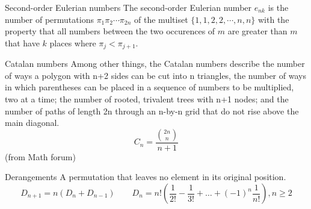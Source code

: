 \begin{algorithm}{Second-order Eulerian numbers}
\desc
The second-order Eulerian number $e_{nk}$ is the number of
permutations $\pi_1 \pi_2 \cdots \pi_{2n}$ of the multiset
$\{1,1,2,2,\cdots,n,n\}$ with the property that all numbers between
the two occurences of $m$ are greater than $m$ that have $k$ places
where $\pi_j < \pi_{j+1}$.
\end{algorithm}

\begin{algorithm}{Catalan numbers}
\keyword{}
Among other things, the Catalan numbers describe the number of ways a polygon
with n+2 sides can be cut into n triangles, the number of ways in which
parentheses can be placed in a sequence of numbers to be multiplied, two at
a time; the number of rooted, trivalent trees with n+1 nodes; and the number
of paths of length 2n through an n-by-n grid that do not rise above the
main diagonal.
$$ C_n = \frac{\binom{2n}{n}}{\scriptstyle n+1} $$
(from Math forum)
\end{algorithm}

\begin{algorithm}{Derangements}
\keyword{}
A permutation that leaves no element in its original position.
$$D_{n+1}=n(D_n+D_{n-1})
\qquad
D_n=n!\left(\frac 1{2!}-\frac 1{3!}+\ldots+(-1)^n\frac 1{n!}\right), n\ge 2$$
\end{algorithm}





